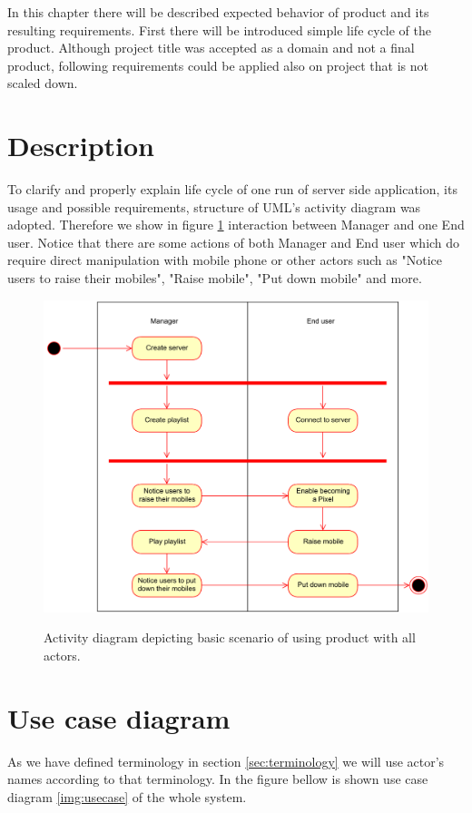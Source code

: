 In this chapter there will be described expected behavior of product and its resulting requirements. 
First there will be introduced simple life cycle of the product.
Although project title was accepted as a domain and not a final product, following requirements could be applied also on project that is not scaled down.

\section{Description}
To clarify and properly explain life cycle of one run of server side application, its usage and possible requirements, structure of UML's activity diagram was adopted. 
Therefore we show in figure \ref{img:activity_diagram} interaction between Manager and one End user.
Notice that there are some actions of both Manager and End user which do require direct manipulation with mobile phone or other actors such as "Notice users to raise their mobiles", "Raise mobile", "Put down mobile" and more.

\begin{figure}[h!]
    
    \begin{center}
    \includegraphics[scale=0.4]{images/activity_diagram.pdf}
    \label{img:activity_diagram}
    \caption{Activity diagram depicting basic scenario of using product with all actors.}
    \end{center}
\end{figure}


\section{Use case diagram}
As we have defined terminology in section \ref{sec:terminology} we will use actor's names according to that terminology.
In the figure bellow is shown use case diagram \ref{img:usecase} of the whole system.

